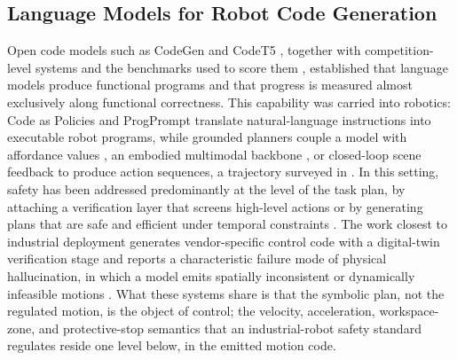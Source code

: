 \documentclass{ieeeaccess}
\begin{document}
\subsection{Language Models for Robot Code Generation}
Open code models such as CodeGen \cite{ref11} and CodeT5 \cite{ref12}, together
with competition-level systems \cite{ref13} and the benchmarks used to score them
\cite{ref14}, established that language models produce functional programs and that
progress is measured almost exclusively along functional correctness. This
capability was carried into robotics: Code as Policies \cite{ref2} and ProgPrompt
\cite{ref3} translate natural-language instructions into executable robot programs,
while grounded planners couple a model with affordance values \cite{ref15}, an
embodied multimodal backbone \cite{ref16}, or closed-loop scene feedback
\cite{ref17} to produce action sequences, a trajectory surveyed in
\cite{ref18}. In this setting, safety has been addressed predominantly at the level
of the task plan, by attaching a verification layer that screens high-level actions
\cite{ref4} or by generating plans that are safe and efficient under temporal
constraints \cite{ref19}. The work closest to industrial deployment generates
vendor-specific control code with a digital-twin verification stage and reports a
characteristic failure mode of physical hallucination, in which a model emits
spatially inconsistent or dynamically infeasible motions \cite{ref20}. What these
systems share is that the symbolic plan, not the regulated motion, is the object of
control; the velocity, acceleration, workspace-zone, and protective-stop semantics
that an industrial-robot safety standard regulates reside one level below, in the
emitted motion code.
\end{document}
